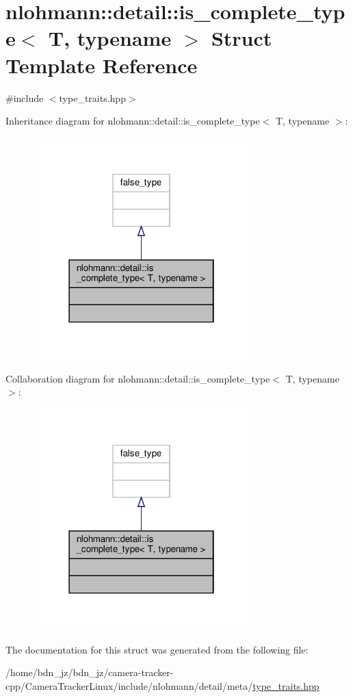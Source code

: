 \hypertarget{structnlohmann_1_1detail_1_1is__complete__type}{}\section{nlohmann\+:\+:detail\+:\+:is\+\_\+complete\+\_\+type$<$ T, typename $>$ Struct Template Reference}
\label{structnlohmann_1_1detail_1_1is__complete__type}


{\ttfamily \#include $<$type\+\_\+traits.\+hpp$>$}



Inheritance diagram for nlohmann\+:\+:detail\+:\+:is\+\_\+complete\+\_\+type$<$ T, typename $>$\+:\nopagebreak
\begin{figure}[H]
\begin{center}
\leavevmode
\includegraphics[width=238pt]{structnlohmann_1_1detail_1_1is__complete__type__inherit__graph}
\end{center}
\end{figure}


Collaboration diagram for nlohmann\+:\+:detail\+:\+:is\+\_\+complete\+\_\+type$<$ T, typename $>$\+:\nopagebreak
\begin{figure}[H]
\begin{center}
\leavevmode
\includegraphics[width=238pt]{structnlohmann_1_1detail_1_1is__complete__type__coll__graph}
\end{center}
\end{figure}


The documentation for this struct was generated from the following file\+:\begin{DoxyCompactItemize}
\item 
/home/bdn\+\_\+jz/bdn\+\_\+jz/camera-\/tracker-\/cpp/\+Camera\+Tracker\+Linux/include/nlohmann/detail/meta/\hyperlink{type__traits_8hpp}{type\+\_\+traits.\+hpp}\end{DoxyCompactItemize}
